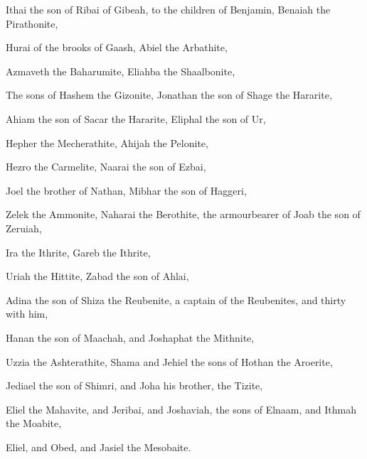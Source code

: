{Ithai the
son of
Ribai of
Gibeah,
{} to the
children of
Benjamin,
Benaiah the
Pirathonite,

Hurai of the
brooks of
Gaash,
Abiel the
Arbathite,

Azmaveth the
Baharumite,
Eliahba the
Shaalbonite,

The
sons of
Hashem the
Gizonite,
Jonathan the
son of
Shage the
Hararite,

Ahiam the
son of
Sacar the
Hararite,
Eliphal the
son of
Ur,

Hepher the
Mecherathite,
Ahijah the
Pelonite,

Hezro the
Carmelite,
Naarai the
son of
Ezbai,

Joel the
brother of
Nathan,
Mibhar the
son of
Haggeri,

Zelek the
Ammonite,
Naharai the
Berothite, the
armourbearer of
Joab the
son of
Zeruiah,

Ira the
Ithrite,
Gareb the
Ithrite,

Uriah the
Hittite,
Zabad the
son of
Ahlai,

Adina the
son of
Shiza the
Reubenite, a
captain of the
Reubenites, and
thirty with him,

Hanan the
son of
Maachah, and
Joshaphat the
Mithnite,

Uzzia the
Ashterathite,
Shama and
Jehiel the
sons of
Hothan the
Aroerite,

Jediael the
son of
Shimri, and
Joha his
brother, the
Tizite,

Eliel the
Mahavite, and
Jeribai, and
Joshaviah, the
sons of
Elnaam, and
Ithmah the
Moabite,

Eliel, and
Obed, and
Jasiel the
Mesobaite.




\par }
